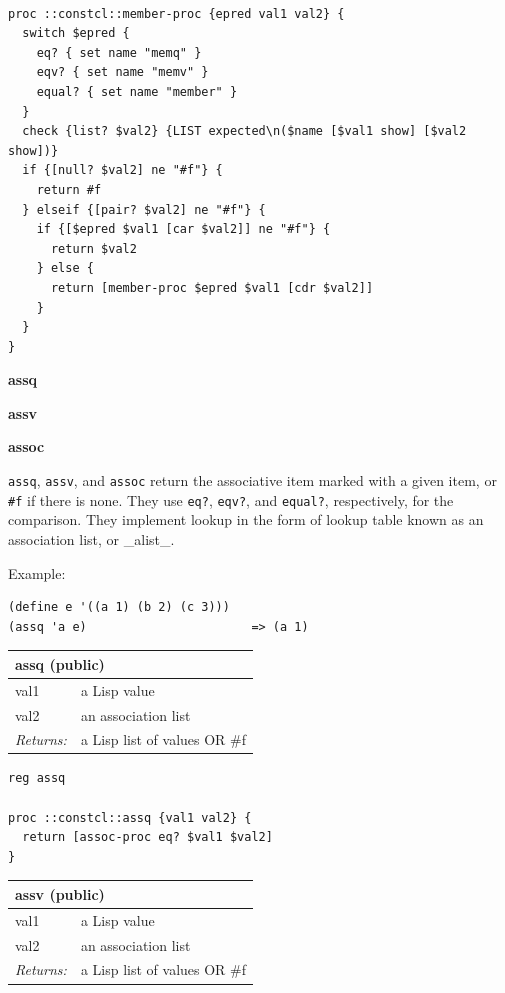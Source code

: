 \documentclass[twoside,9pt]{report}
\begin{document}
\noindent\makebox[\linewidth]{\rule{\linewidth}{0.4pt}}
\begin{lstlisting}
 
proc ::constcl::member-proc {epred val1 val2} {
  switch $epred {
    eq? { set name "memq" }
    eqv? { set name "memv" }
    equal? { set name "member" }
  }
  check {list? $val2} {LIST expected\n($name [$val1 show] [$val2 show])}
  if {[null? $val2] ne "#f"} {
    return #f
  } elseif {[pair? $val2] ne "#f"} {
    if {[$epred $val1 [car $val2]] ne "#f"} {
      return $val2
    } else {
      return [member-proc $epred $val1 [cdr $val2]]
    }
  }
}
\end{lstlisting}
\noindent\makebox[\linewidth]{\rule{\linewidth}{0.4pt}}

\textbf{assq}


\textbf{assv}


\textbf{assoc}


\texttt{assq}, \texttt{assv}, and \texttt{assoc} return the associative item marked with a given item, or \texttt{\#f} if there is none. They use \texttt{eq?}, \texttt{eqv?}, and \texttt{equal?}, respectively, for the comparison. They implement lookup in the form of lookup table known as an association list, or \_alist\_.


Example:

\noindent\makebox[\linewidth]{\rule{\linewidth}{0.4pt}}
\begin{lstlisting}
(define e '((a 1) (b 2) (c 3)))
(assq 'a e)                       => (a 1)
\end{lstlisting}
\noindent\makebox[\linewidth]{\rule{\linewidth}{0.4pt}}
\begin{tabular}{ |l l| }
\hline
\multicolumn{2}{|l|}{assq (public)} \\
\hline
val1 & a Lisp value \\
val2 & an association list \\
\textit{Returns:} & a Lisp list of values OR \#f \\
\hline
\end{tabular}

\noindent\makebox[\linewidth]{\rule{\linewidth}{0.4pt}}
\begin{lstlisting}
reg assq
 
proc ::constcl::assq {val1 val2} {
  return [assoc-proc eq? $val1 $val2]
}
\end{lstlisting}
\noindent\makebox[\linewidth]{\rule{\linewidth}{0.4pt}}
\begin{tabular}{ |l l| }
\hline
\multicolumn{2}{|l|}{assv (public)} \\
\hline
val1 & a Lisp value \\
val2 & an association list \\
\textit{Returns:} & a Lisp list of values OR \#f \\
\hline
\end{tabular}
\end{document}
